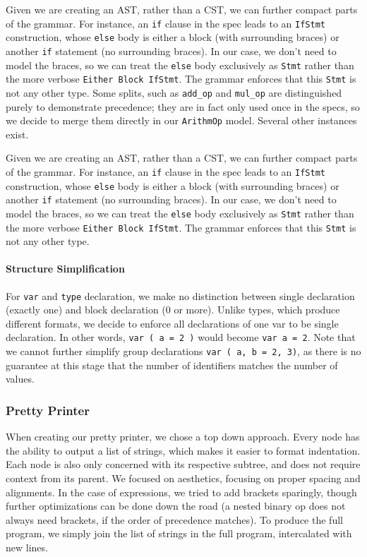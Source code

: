 \documentclass[11pt]{article}
\begin{document}
Given we are creating an AST, rather than a CST, we can further
compact parts of the grammar. For instance, an \texttt{if} clause in the
spec leads to an \texttt{IfStmt} construction, whose \texttt{else} body is either
a block (with surrounding braces) or another \texttt{if} statement (no
surrounding braces). In our case, we don't need to model the braces,
so we can treat the \texttt{else} body exclusively as \texttt{Stmt} rather than
the more verbose \texttt{Either Block IfStmt}. The grammar enforces that
this \texttt{Stmt} is not any other type.
Some splits, such as \texttt{add\_op} and \texttt{mul\_op} are distinguished
purely to demonstrate precedence; they are in fact only used once
in the specs, so we decide to merge them directly in our \texttt{ArithmOp}
model. Several other instances exist.

Given we are creating an AST, rather than a CST, we can further
compact parts of the grammar. For instance, an \texttt{if} clause in the
spec leads to an \texttt{IfStmt} construction, whose \texttt{else} body is either
a block (with surrounding braces) or another \texttt{if} statement (no
surrounding braces). In our case, we don't need to model the braces,
so we can treat the \texttt{else} body exclusively as \texttt{Stmt} rather than
the more verbose \texttt{Either Block IfStmt}. The grammar enforces that
this \texttt{Stmt} is not any other type.
\paragraph{Structure Simplification}
For \texttt{var} and \texttt{type} declaration, we make no distinction between
single declaration (exactly one) and block declaration (0 or
more). Unlike types, which produce different formats, we decide to
enforce all declarations of one var to be single declaration. In
other words, \texttt{var ( a = 2 )} would become \texttt{var a = 2}. Note that
we cannot further simplify group declarations \texttt{var ( a, b = 2,
	3)}, as there is no guarantee at this stage that the number of
identifiers matches the number of values.
\subsubsection{Pretty Printer}
When creating our pretty printer, we chose a top down approach.
Every node has the ability to output a list of strings, which makes
it easier to format indentation. Each node is also only concerned
with its respective subtree, and does not require context from its
parent. We focused on aesthetics, focusing on proper spacing and
alignments. In the case of expressions, we tried to add brackets
sparingly, though further optimizations can be done down the road
(a nested binary op does not always need brackets, if the order of
precedence matches). To produce the full program, we simply join
the list of strings in the full program, intercalated with new lines.
\end{document}
